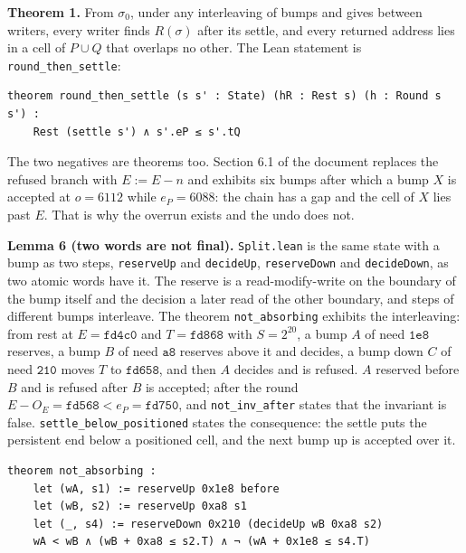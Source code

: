 \textbf{Theorem 1.} From \(\sigma_0\), under any interleaving of bumps and gives between writers, every writer finds \(R(\sigma)\) after its settle, and every returned address lies in a cell of \(P \cup Q\) that overlaps no other. The Lean statement is \texttt{round\_\allowbreak{}then\_\allowbreak{}settle}:

\begin{Verbatim}
theorem round_then_settle (s s' : State) (hR : Rest s) (h : Round s s') :
    Rest (settle s') ∧ s'.eP ≤ s'.tQ
\end{Verbatim}

The two negatives are theorems too. Section 6.1 of the document replaces the refused branch with \(E := E - n\) and exhibits six bumps after which a bump \(X\) is accepted at \(o = 6112\) while \(e_P = 6088\): the chain has a gap and the cell of \(X\) lies past \(E\). That is why the overrun exists and the undo does not.

\textbf{Lemma 6 (two words are not final).} \texttt{Split.\allowbreak{}lean} is the same state with a bump as two steps, \texttt{reserve\allowbreak{}Up} and \texttt{decide\allowbreak{}Up}, \texttt{reserve\allowbreak{}Down} and \texttt{decide\allowbreak{}Down}, as two atomic words have it. The reserve is a read-modify-write on the boundary of the bump itself and the decision a later read of the other boundary, and steps of different bumps interleave. The theorem \texttt{not\_\allowbreak{}absorbing} exhibits the interleaving: from rest at \(E = \mathtt{fd4c0}\) and \(T = \mathtt{fd868}\) with \(S = 2^{20}\), a bump \(A\) of need \(\mathtt{1e8}\) reserves, a bump \(B\) of need \(\mathtt{a8}\) reserves above it and decides, a bump down \(C\) of need \(\mathtt{210}\) moves \(T\) to \(\mathtt{fd658}\), and then \(A\) decides and is refused. \(A\) reserved before \(B\) and is refused after \(B\) is accepted; after the round \(E - O_E = \mathtt{fd568} < e_P = \mathtt{fd750}\), and \texttt{not\_\allowbreak{}inv\_\allowbreak{}after} states that the invariant is false. \texttt{settle\_\allowbreak{}below\_\allowbreak{}positioned} states the consequence: the settle puts the persistent end below a positioned cell, and the next bump up is accepted over it.

\begin{Verbatim}
theorem not_absorbing :
    let (wA, s1) := reserveUp 0x1e8 before
    let (wB, s2) := reserveUp 0xa8 s1
    let (_, s4) := reserveDown 0x210 (decideUp wB 0xa8 s2)
    wA < wB ∧ (wB + 0xa8 ≤ s2.T) ∧ ¬ (wA + 0x1e8 ≤ s4.T)
\end{Verbatim}


